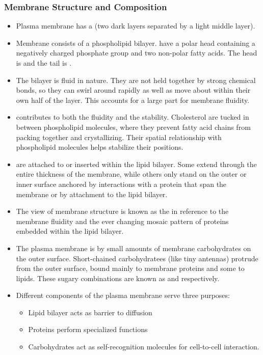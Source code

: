 \documentclass{article}
\numberwithin{equation}{section}
\begin{document}
\subsubsection{Membrane Structure and Composition}
\begin{itemize}
    \item Plasma membrane has a  (two dark layers separated by a light middle layer).
    \item Membrane consists of a phospholipid bilayer.  have a polar head containing a negatively charged phosphate group and two non-polar fatty acids. The head is  and the tail is .
    \item The bilayer is fluid in nature. They are not held together by strong chemical bonds, so they can swirl around rapidly as well as move about within their own half of the layer. This accounts for a large part for membrane fluidity.
    \item {} contributes to both the fluidity and the stability.  Cholesterol are tucked in between phospholipid molecules, where they prevent fatty acid chains from packing together and crystallizing. Their spatial relationship with phospholipid molecules helps stabilize their positions.
    \item {} are attached to or inserted within the lipid bilayer. Some extend through the entire thickness of the membrane, while others only stand on the outer or inner surface anchored by interactions with a protein that span the membrane or by attachment to the lipid bilayer.
    \item The view of membrane structure is known as the  in reference to the membrane fluidity and the ever changing mosaic pattern of proteins embedded within the lipid bilayer.
    \item The plasma membrane is  by small amounts of membrane carbohydrates on the outer surface. Short-chained carbohydratees (like tiny antennas) protrude from the outer surface, bound mainly to membrane proteins and some to lipids. These sugary combinations are known as  and  respectively.
    \item Different components of the plasma membrane serve three purposes:
    \begin{itemize}
        \item Lipid bilayer acts as barrier to diffusion
        \item Proteins perform specialized functions
        \item Carbohydrates act as self-recognition molecules for cell-to-cell interaction.
    \end{itemize}
\end{itemize}
\end{document}
